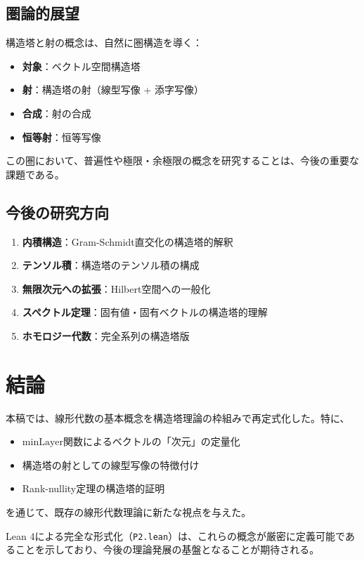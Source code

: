 \documentclass[a4paper,11pt]{ltjsarticle}
\theoremstyle{definition}
\begin{document}
\subsection{圏論的展望}

構造塔と射の概念は、自然に圏構造を導く：

\begin{itemize}
  \item \textbf{対象}：ベクトル空間構造塔
  \item \textbf{射}：構造塔の射（線型写像 + 添字写像）
  \item \textbf{合成}：射の合成
  \item \textbf{恒等射}：恒等写像
\end{itemize}

この圏において、普遍性や極限・余極限の概念を研究することは、今後の重要な課題である。

\subsection{今後の研究方向}

\begin{enumerate}
  \item \textbf{内積構造}：Gram-Schmidt直交化の構造塔的解釈
  \item \textbf{テンソル積}：構造塔のテンソル積の構成
  \item \textbf{無限次元への拡張}：Hilbert空間への一般化
  \item \textbf{スペクトル定理}：固有値・固有ベクトルの構造塔的理解
  \item \textbf{ホモロジー代数}：完全系列の構造塔版
\end{enumerate}

\section{結論}

本稿では、線形代数の基本概念を構造塔理論の枠組みで再定式化した。特に、
\begin{itemize}
  \item $\mathrm{minLayer}$関数によるベクトルの「次元」の定量化
  \item 構造塔の射としての線型写像の特徴付け
  \item Rank-nullity定理の構造塔的証明
\end{itemize}
を通じて、既存の線形代数理論に新たな視点を与えた。

Lean 4による完全な形式化（\texttt{P2.lean}）は、これらの概念が厳密に定義可能であることを示しており、今後の理論発展の基盤となることが期待される。
\end{document}
